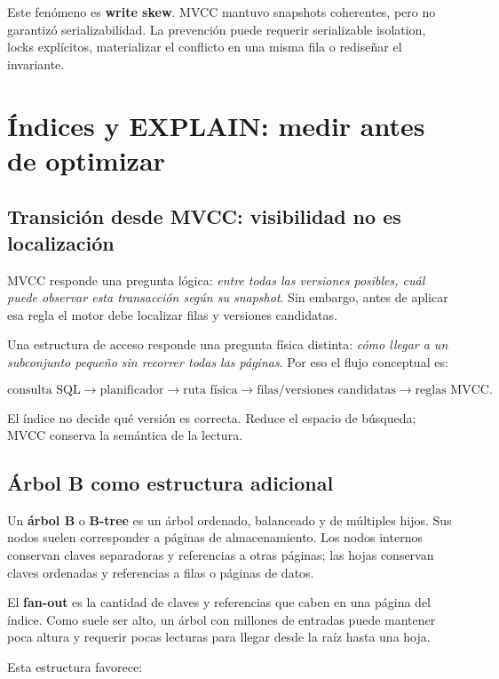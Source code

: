 \documentclass[variant=apuntes,cover=institutional,mode=screen]{ua-engineering-v6-article}
\begin{document}
Este fenómeno es \textbf{write skew}. MVCC mantuvo snapshots coherentes, pero no garantizó serializabilidad. La prevención puede requerir serializable isolation, locks explícitos, materializar el conflicto en una misma fila o rediseñar el invariante.

\section{Índices y EXPLAIN: medir antes de optimizar}

\subsection{Transición desde MVCC: visibilidad no es localización}

MVCC responde una pregunta lógica: \emph{entre todas las versiones posibles, cuál puede observar esta transacción según su snapshot}. Sin embargo, antes de aplicar esa regla el motor debe localizar filas y versiones candidatas.

Una estructura de acceso responde una pregunta física distinta: \emph{cómo llegar a un subconjunto pequeño sin recorrer todas las páginas}. Por eso el flujo conceptual es:

\[
\text{consulta SQL}
\rightarrow
\text{planificador}
\rightarrow
\text{ruta física}
\rightarrow
\text{filas/versiones candidatas}
\rightarrow
\text{reglas MVCC}.
\]

El índice no decide qué versión es correcta. Reduce el espacio de búsqueda; MVCC conserva la semántica de la lectura.

\subsection{Árbol B como estructura adicional}

Un \textbf{árbol B} o \textbf{B-tree} es un árbol ordenado, balanceado y de múltiples hijos. Sus nodos suelen corresponder a páginas de almacenamiento. Los nodos internos conservan claves separadoras y referencias a otras páginas; las hojas conservan claves ordenadas y referencias a filas o páginas de datos.

El \textbf{fan-out} es la cantidad de claves y referencias que caben en una página del índice. Como suele ser alto, un árbol con millones de entradas puede mantener poca altura y requerir pocas lecturas para llegar desde la raíz hasta una hoja.

Esta estructura favorece:
\end{document}
